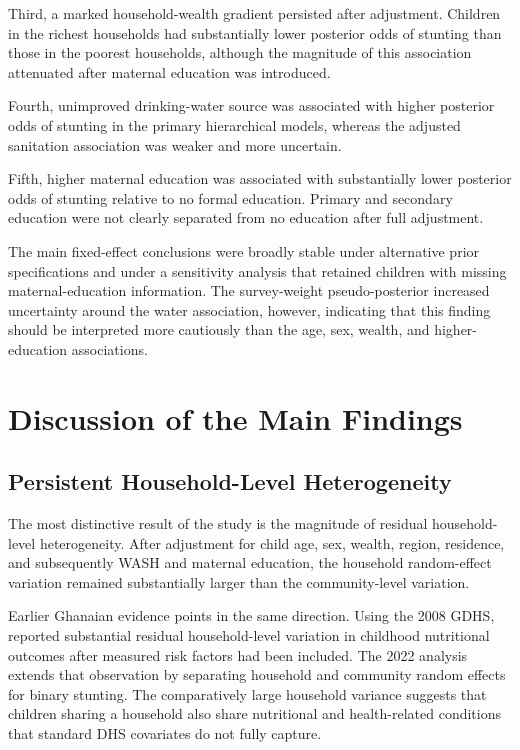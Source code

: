 Third, a marked household-wealth gradient persisted after adjustment. Children in the richest households had substantially lower posterior odds of stunting than those in the poorest households, although the magnitude of this association attenuated after maternal education was introduced.

Fourth, unimproved drinking-water source was associated with higher posterior odds of stunting in the primary hierarchical models, whereas the adjusted sanitation association was weaker and more uncertain.

Fifth, higher maternal education was associated with substantially lower posterior odds of stunting relative to no formal education. Primary and secondary education were not clearly separated from no education after full adjustment.

The main fixed-effect conclusions were broadly stable under alternative prior specifications and under a sensitivity analysis that retained children with missing maternal-education information. The survey-weight pseudo-posterior increased uncertainty around the water association, however, indicating that this finding should be interpreted more cautiously than the age, sex, wealth, and higher-education associations.

\section{Discussion of the Main Findings}

\subsection{Persistent Household-Level Heterogeneity}

The most distinctive result of the study is the magnitude of residual household-level heterogeneity. After adjustment for child age, sex, wealth, region, residence, and subsequently WASH and maternal education, the household random-effect variation remained substantially larger than the community-level variation.

Earlier Ghanaian evidence points in the same direction. Using the 2008 GDHS, \citet{AhetoEtAl2015} reported substantial residual household-level variation in childhood nutritional outcomes after measured risk factors had been included. The 2022 analysis extends that observation by separating household and community random effects for binary stunting. The comparatively large household variance suggests that children sharing a household also share nutritional and health-related conditions that standard DHS covariates do not fully capture.

